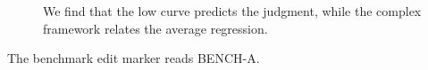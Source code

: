 \documentclass[11pt]{article}
\begin{document}
\listoffigures
\begin{figure}\caption{We find that the low curve predicts the judgment, while the complex framework relates the average regression.}\end{figure}
The benchmark edit marker reads BENCH-A.
\end{document}
